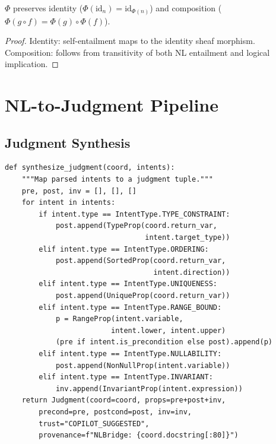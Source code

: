 \documentclass[11pt]{article}
\newcommand{\SpecFunctor}{\Phi}
\begin{document}
\begin{theorem}\label{thm:functor-laws}
$\SpecFunctor$ preserves identity ($\SpecFunctor(\mathrm{id}_n) =
\mathrm{id}_{\SpecFunctor(n)}$) and composition
($\SpecFunctor(g \circ f) = \SpecFunctor(g) \circ \SpecFunctor(f)$).
\end{theorem}

\begin{proof}
Identity: self-entailment maps to the identity sheaf morphism.
Composition: follows from transitivity of both NL entailment and
logical implication.
\end{proof}

\section{NL-to-Judgment Pipeline}\label{sec:pipeline}

\subsection{Judgment Synthesis}

\begin{lstlisting}[style=jugeo-python]
def synthesize_judgment(coord, intents):
    """Map parsed intents to a judgment tuple."""
    pre, post, inv = [], [], []
    for intent in intents:
        if intent.type == IntentType.TYPE_CONSTRAINT:
            post.append(TypeProp(coord.return_var,
                                 intent.target_type))
        elif intent.type == IntentType.ORDERING:
            post.append(SortedProp(coord.return_var,
                                   intent.direction))
        elif intent.type == IntentType.UNIQUENESS:
            post.append(UniqueProp(coord.return_var))
        elif intent.type == IntentType.RANGE_BOUND:
            p = RangeProp(intent.variable,
                         intent.lower, intent.upper)
            (pre if intent.is_precondition else post).append(p)
        elif intent.type == IntentType.NULLABILITY:
            post.append(NonNullProp(intent.variable))
        elif intent.type == IntentType.INVARIANT:
            inv.append(InvariantProp(intent.expression))
    return Judgment(coord=coord, props=pre+post+inv,
        precond=pre, postcond=post, inv=inv,
        trust="COPILOT_SUGGESTED",
        provenance=f"NLBridge: {coord.docstring[:80]}")
\end{lstlisting}
\end{document}
